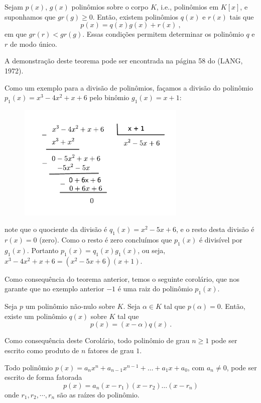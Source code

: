  \begin{teo}
  Sejam $p(x)$, $g(x)$ polinômios sobre o corpo $K$, i.e., polinômios em $K[x]$, e suponhamos que $gr(g) \geq 0$. Então, existem polinômios $q(x)$ e $r(x)$ tais que
  \[p(x)= q(x)g(x) + r(x) \ , \]
  em que $gr(r) < gr (g)$. Essas condições permitem determinar os polinômio $q$ e $r$ de modo único.
 \end{teo}

 \begin{dem}
 A demonstração deste teorema pode ser encontrada na página 58 do (LANG, 1972).
 \end{dem}



 \begin{exem}
  Como um exemplo para a divisão de polinômios, façamos a divisão do polinômio $p_1(x)=x^3-4x^2+x+6$ pelo binômio $g_1(x)=x+1$:

 \begin{figure}[H]
 \centering
 \includegraphics[width=8cm]{../Topicos/Figuras/polinomiosdivisao.pdf}
 \end{figure}

 note que o quociente da divisão é $q_1(x)= x^2 - 5x + 6$, e o resto desta divisão é $r(x)=0$ (zero). Como o resto é zero concluímos que $p_1(x)$ é divisível por $g_1(x)$. Portanto $p_1(x)= q_1(x)g_1(x)$, ou seja, $x^3-4x^2+x+6= (x^2-5x+6)(x+1)$.
 \end{exem}

 Como consequência do teorema anterior, temos o seguinte corolário, que nos garante que no exemplo anterior $-1$ é uma raiz do polinômio $p_1(x)$.

 \begin{cor}
 Seja $p$ um polinômio não-nulo sobre $K$. Seja $\alpha \in K$ tal que $p(\alpha)=0$. Então, existe um polinômio $q(x)$ sobre $K$ tal que
 \[p(x)= (x - \alpha)q(x) \ .\]
 \end{cor}

 Como consequência deste Corolário, todo polinômio de grau $n \geq 1$ pode ser escrito como produto de $n$ fatores de grau $1$.

 \begin{teo}
  Todo polinômio $p(x)= a_nx^n + a_{n-1}x^{n-1}+ \ldots + a_1x+ a_0$, com $a_n \neq 0$, pode ser escrito de forma fatorada
  \[p(x)= a_n(x - r_1)(x - r_2) \ldots (x - r_n)\]
  onde $r_1, r_2, \cdots, r_n$ são as raízes do polinômio.
 \end{teo}
